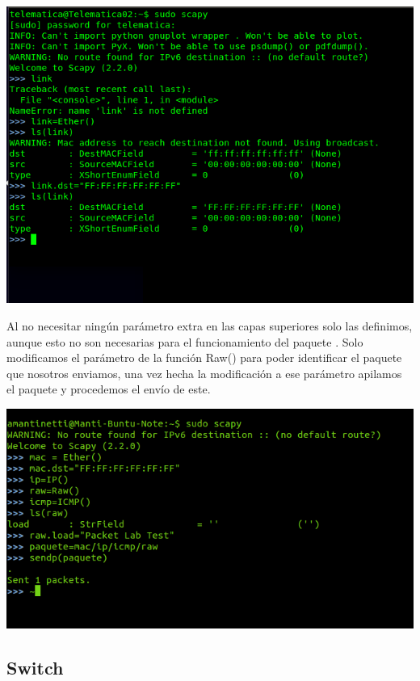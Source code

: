 \documentclass[spanish]{udpreport}
\begin{document}
\begin{center}
	\includegraphics[scale=.37]{imagenes/Switch/Test_1a_b.png}
\end{center}

Al no necesitar ningún parámetro extra en las capas superiores solo las definimos, aunque esto no son necesarias para el funcionamiento del paquete . Solo modificamos el parámetro de la función Raw() para poder identificar el paquete que nosotros enviamos, una vez hecha la modificación a ese parámetro apilamos el paquete y procedemos el envío de este.


\begin{center}
	\includegraphics[scale=.37]{imagenes/Switch/Test_1a_c.png}
\end{center}
\newpage
\subsection{Switch}
\end{document}
